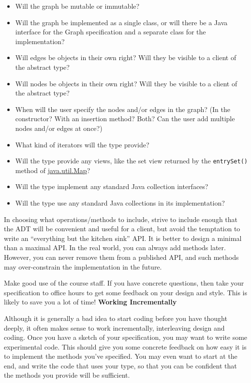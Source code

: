 \documentclass[11pt]{article}
\begin{document}
\begin{itemize}
\item Will the graph be mutable or immutable?
\item Will the graph be implemented as a single class, or will there be a Java interface for the Graph specification and a separate class for the implementation?
\item Will edges be objects in their own right? Will they be visible to a client of the abstract type?
\item Will nodes be objects in their own right? Will they be visible to a client of the abstract type?
\item When will the user specify the nodes and/or edges in the graph? (In the constructor? With an insertion method? Both? Can the user add multiple nodes and/or edges at once?)
\item What kind of iterators will the type provide?
\item Will the type provide any views, like the set view returned by the \texttt{entrySet()} method of \href{http://docs.oracle.com/javase/8/docs/api/java/util/Map.html}{java.util.Map}?
\item Will the type implement any standard Java collection interfaces?
\item Will the type use any standard Java collections in its implementation?
\end{itemize}

\noindent In choosing what operations/methods to include, strive to include enough that the ADT will be convenient and useful for a client, but avoid the temptation to write an “everything but the kitchen sink” API. It is better to design a minimal than a maximal API. In the real world, you can always add methods later. However, you can never remove them from a published API, and such methods may over-constrain the implementation in the future.

\noindent Make good use of the course staff. If you have concrete questions, then take your specification to office hours to get some feedback on your design and style. This is likely to save you a lot of time!
\newpage
\noindent \large{\textbf{Working Incrementally}}

\noindent Although it is generally a bad idea to start coding before you have thought deeply, it often makes sense to work incrementally, interleaving design and coding. Once you have a sketch of your specification, you may want to write some experimental code. This should give you some concrete feedback on how easy it is to implement the methods you've specified. You may even want to start at the end, and write the code that uses your type, so that you can be confident that the methods you provide will be sufficient.
\end{document}

